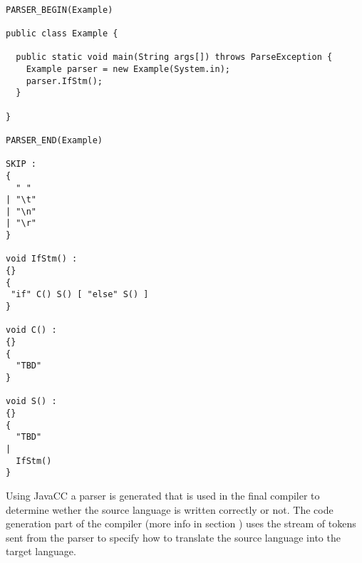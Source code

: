 \begin{lstlisting}[caption={One of JavaCC's standard examples on how to make a grammar that accepts ``if''-statements.}, label=lst:javacc-grammar-example]

PARSER_BEGIN(Example)

public class Example {

  public static void main(String args[]) throws ParseException {
    Example parser = new Example(System.in);
    parser.IfStm();
  }

}

PARSER_END(Example)

SKIP :
{
  " "
| "\t"
| "\n"
| "\r"
}

void IfStm() :
{}
{
 "if" C() S() [ "else" S() ]
}

void C() :
{}
{
  "TBD"
}

void S() :
{}
{
  "TBD"
|
  IfStm()
}
\end{lstlisting}

Using JavaCC a parser is generated that is used in the final compiler to determine wether the source language is written correctly or not. The code generation part of the compiler (more info in section ) uses the stream of tokens sent from the parser to specify how to translate the source language into the target language. 